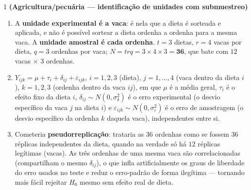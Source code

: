 \documentclass[11pt]{article}
\begin{document}

\begin{questao}{1} \textbf{(Agricultura/pecuária --- identificação de unidades com submuestreo)}
\end{questao}
\begin{solucao}
\begin{enumerate}[label=(\alph*)]
  \item A \textbf{unidade experimental é a vaca}: é nela que a dieta é sorteada e aplicada, e não
    é possível sortear a dieta ordenha a ordenha para a mesma vaca. A \textbf{unidade amostral é
    cada ordenha}. $t=3$ dietas, $r=4$ vacas por dieta, $q=3$ ordenhas por vaca; $N = trq =
    3\times4\times3 = \textbf{36}$, que bate com $12$ vacas $\times$ 3 ordenhas.
  \item $Y_{ijk} = \mu + \tau_i + \delta_{ij} + \varepsilon_{ijk}$, $i=1,2,3$ (dieta), $j=1,\ldots,4$
    (vaca dentro da dieta $i$), $k=1,2,3$ (ordenha dentro da vaca $ij$), em que $\mu$ é a média
    geral, $\tau_i$ é o efeito fixo da dieta $i$, $\delta_{ij}\sim N(0,\sigma_\delta^2)$ é o erro
    experimental (o desvio específico da vaca $j$ na dieta $i$) e $\varepsilon_{ijk} \sim
    N(0,\sigma_\varepsilon^2)$ é o erro de amostragem (o desvio específico da ordenha $k$ daquela
    vaca), independentes entre si.
  \item Cometeria \textbf{pseudorreplicação}: trataria as $36$ ordenhas como se fossem $36$
    réplicas independentes da dieta, quando na verdade só há $12$ réplicas legítimas (vacas). As
    três ordenhas de uma mesma vaca são correlacionadas (compartilham o mesmo $\delta_{ij}$), o
    que infla artificialmente os graus de liberdade do erro usados no teste e reduz o erro-padrão
    de forma ilegítima --- tornando mais fácil rejeitar $H_0$ mesmo sem efeito real de dieta.
\end{enumerate}
\end{solucao}
\end{document}
